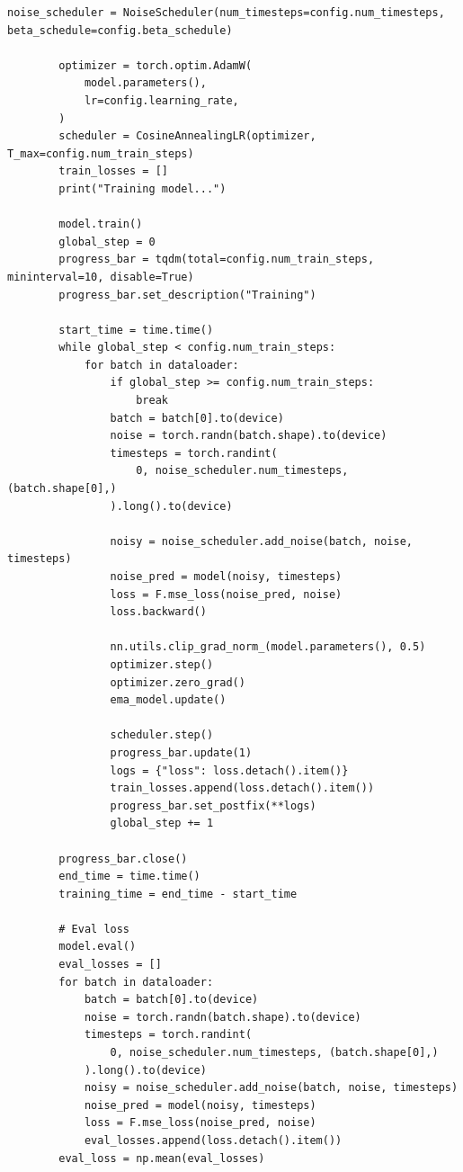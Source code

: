 \begin{appendices}
\begin{tcolorbox}[breakable,colback=orange!5!white, colframe=orange!80!black, title=Generalized Idea Generation System and User Prompt]
\begin{Verbatim}[breaklines, breaksymbol={}, breaksymbolleft={}, fontsize=\small]
        noise_scheduler = NoiseScheduler(num_timesteps=config.num_timesteps, beta_schedule=config.beta_schedule)

        optimizer = torch.optim.AdamW(
            model.parameters(),
            lr=config.learning_rate,
        )
        scheduler = CosineAnnealingLR(optimizer, T_max=config.num_train_steps)
        train_losses = []
        print("Training model...")

        model.train()
        global_step = 0
        progress_bar = tqdm(total=config.num_train_steps, mininterval=10, disable=True)
        progress_bar.set_description("Training")

        start_time = time.time()
        while global_step < config.num_train_steps:
            for batch in dataloader:
                if global_step >= config.num_train_steps:
                    break
                batch = batch[0].to(device)
                noise = torch.randn(batch.shape).to(device)
                timesteps = torch.randint(
                    0, noise_scheduler.num_timesteps, (batch.shape[0],)
                ).long().to(device)

                noisy = noise_scheduler.add_noise(batch, noise, timesteps)
                noise_pred = model(noisy, timesteps)
                loss = F.mse_loss(noise_pred, noise)
                loss.backward()

                nn.utils.clip_grad_norm_(model.parameters(), 0.5)
                optimizer.step()
                optimizer.zero_grad()
                ema_model.update()

                scheduler.step()
                progress_bar.update(1)
                logs = {"loss": loss.detach().item()}
                train_losses.append(loss.detach().item())
                progress_bar.set_postfix(**logs)
                global_step += 1

        progress_bar.close()
        end_time = time.time()
        training_time = end_time - start_time

        # Eval loss
        model.eval()
        eval_losses = []
        for batch in dataloader:
            batch = batch[0].to(device)
            noise = torch.randn(batch.shape).to(device)
            timesteps = torch.randint(
                0, noise_scheduler.num_timesteps, (batch.shape[0],)
            ).long().to(device)
            noisy = noise_scheduler.add_noise(batch, noise, timesteps)
            noise_pred = model(noisy, timesteps)
            loss = F.mse_loss(noise_pred, noise)
            eval_losses.append(loss.detach().item())
        eval_loss = np.mean(eval_losses)


\end{Verbatim}
\end{tcolorbox}
\end{appendices}
